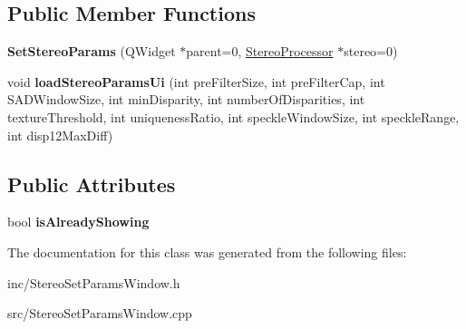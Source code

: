 \subsection*{Public Member Functions}
\begin{DoxyCompactItemize}
\item 
{\bfseries Set\+Stereo\+Params} (Q\+Widget $\ast$parent=0, \hyperlink{class_stereo_processor}{Stereo\+Processor} $\ast$stereo=0)\hypertarget{class_set_stereo_params_aaf018e3767a36e75d67bff30054aeb13}{}\label{class_set_stereo_params_aaf018e3767a36e75d67bff30054aeb13}

\item 
void {\bfseries load\+Stereo\+Params\+Ui} (int pre\+Filter\+Size, int pre\+Filter\+Cap, int S\+A\+D\+Window\+Size, int min\+Disparity, int number\+Of\+Disparities, int texture\+Threshold, int uniqueness\+Ratio, int speckle\+Window\+Size, int speckle\+Range, int disp12\+Max\+Diff)\hypertarget{class_set_stereo_params_ae7d54e42d1b2ec75f0bf196beee5b002}{}\label{class_set_stereo_params_ae7d54e42d1b2ec75f0bf196beee5b002}

\end{DoxyCompactItemize}
\subsection*{Public Attributes}
\begin{DoxyCompactItemize}
\item 
bool {\bfseries is\+Already\+Showing}\hypertarget{class_set_stereo_params_a5f1883727db1c5b05ff573d1c66f0768}{}\label{class_set_stereo_params_a5f1883727db1c5b05ff573d1c66f0768}

\end{DoxyCompactItemize}


The documentation for this class was generated from the following files\+:\begin{DoxyCompactItemize}
\item 
inc/Stereo\+Set\+Params\+Window.\+h\item 
src/Stereo\+Set\+Params\+Window.\+cpp\end{DoxyCompactItemize}
